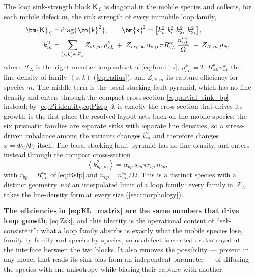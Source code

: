 \documentclass{article}
\newcommand{\spvec}[1]{\bm{\mathsf{#1}}}   %
\newcommand{\spmat}[1]{\bm{\mathsf{#1}}}   %
\begin{document}
The loop sink-strength block $\spmat{K}_{\mathcal L}$ is diagonal in the mobile
species and collects, for each mobile defect $m$, the sink strength of every
immobile loop family,
\begin{align}
\spmat{K}_{\mathcal L}&=\mathrm{diag}\{\spvec{k}^2\},\qquad
\spvec{k}^2=\begin{bmatrix} k_v^2 \ k_i^2 \ k_{2i}^2 \ k_{3i}^2 \end{bmatrix},
\notag\\
k_m^2&=\sum_{(s,k)\in\mathcal F_L}Z_{sk,m}\,\rho^k_{sL}
      \;+\;Z_{vc_0,m}\,\alpha_{\mathrm{sfp}}\,\pi R^{c_0}_{vL}\,
        \frac{n^{c_0}_{vL}}{\Omega}
      \;+\;Z_{N,m}\,\rho_N ,
\label{eq:KL_matrix}
\end{align}
where $\mathcal F_L$ is the eight-member loop subset of \cref{eq:families},
$\rho^k_{sL}=2\pi R^k_{sL}n^k_{sL}$ the line density of family $(s,k)$
(\cref{eq:radius}), and $Z_{sk,m}$ its capture efficiency for species $m$. The
middle term is the basal stacking-fault pyramid, which has no line density and
enters through the compact cross-section \cref{eq:partial_sink_bp} instead; by
\cref{eq:Pi-identity,eq:Pisfp} it is exactly the cross-section that drives its
growth.  is the
first place the resolved layout acts back on the mobile species: the six
prismatic families are separate sinks with separate line densities, so a
stress-driven imbalance among the variants changes $k_m^2$ and therefore changes
$x=\Phi_V/\Phi_I$ itself. The basal stacking-fault pyramid has no line
density, and enters instead through the compact cross-section
\begin{equation}\label{eq:partial_sink_bp}
\left\langle k^2_{bp,m}\right\rangle=\alpha_{bp}\,s_{bp}\,\pi r_{bp}\,n_{bp},
\end{equation}
with $r_{bp}=R^{c_0}_{vL}$ of \cref{eq:Rsfp} and $n_{bp}=n^{c_0}_{vL}/\Omega$.
This is a distinct species with a distinct geometry, \emph{not} an interpolated
limit of a loop family: every family in $\mathcal F_L$ takes the line-density form
at every size (\cref{sec:morphology}).

\textbf{The efficiencies in \cref{eq:KL_matrix} are the same numbers that drive
loop growth}, \cref{eq:Zsk}, and this identity is the operational content of
``self-consistent'': what a loop family absorbs is exactly what the mobile
species lose, family by family and species by species, so no defect is created
or destroyed at the interface between the two blocks. It also removes the
possibility --- present in any model that reads its sink bias from an
independent parameter --- of diffusing the species with one anisotropy while
biasing their capture with another.
\end{document}
